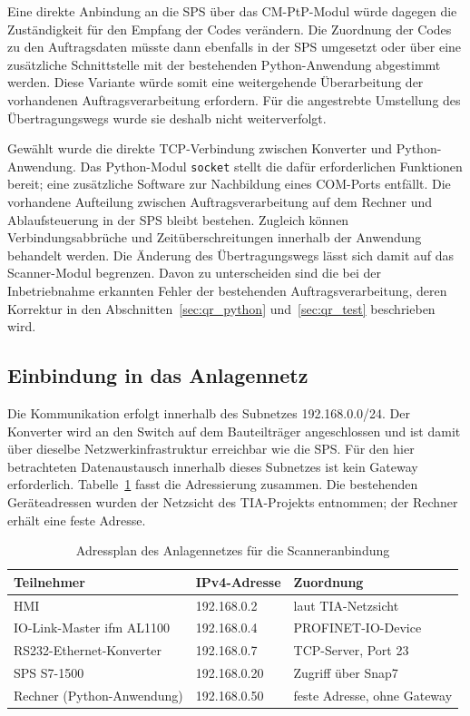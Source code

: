 Eine direkte Anbindung an die SPS über das CM-PtP-Modul würde dagegen die Zuständigkeit für den Empfang der Codes verändern. Die Zuordnung der Codes zu den Auftragsdaten müsste dann ebenfalls in der SPS umgesetzt oder über eine zusätzliche Schnittstelle mit der bestehenden Python-Anwendung abgestimmt werden. Diese Variante würde somit eine weitergehende Überarbeitung der vorhandenen Auftragsverarbeitung erfordern. Für die angestrebte Umstellung des Übertragungswegs wurde sie deshalb nicht weiterverfolgt.

Gewählt wurde die direkte TCP-Verbindung zwischen Konverter und Python-Anwendung. Das Python-Modul \texttt{socket} stellt die dafür erforderlichen Funktionen bereit; eine zusätzliche Software zur Nachbildung eines COM-Ports entfällt. \cite{python_socket_api} Die vorhandene Aufteilung zwischen Auftragsverarbeitung auf dem Rechner und Ablaufsteuerung in der SPS bleibt bestehen. Zugleich können Verbindungsabbrüche und Zeitüberschreitungen innerhalb der Anwendung behandelt werden. Die Änderung des Übertragungswegs lässt sich damit auf das Scanner-Modul begrenzen. Davon zu unterscheiden sind die bei der Inbetriebnahme erkannten Fehler der bestehenden Auftragsverarbeitung, deren Korrektur in den Abschnitten~\ref{sec:qr_python} und~\ref{sec:qr_test} beschrieben wird.

\subsection{Einbindung in das Anlagennetz}
\label{sec:qr_netz}

Die Kommunikation erfolgt innerhalb des Subnetzes 192.168.0.0/24. Der Konverter wird an den Switch auf dem Bauteilträger angeschlossen und ist damit über dieselbe Netzwerkinfrastruktur erreichbar wie die SPS. Für den hier betrachteten Datenaustausch innerhalb dieses Subnetzes ist kein Gateway erforderlich. \cite[Abschn.~3.3.1.1]{rfc1122} Tabelle~\ref{tab:qr_adressplan} fasst die Adressierung zusammen. Die bestehenden Geräteadressen wurden der Netzsicht des TIA-Projekts entnommen; der Rechner erhält eine feste Adresse.

\begin{table}[htbp]
  \centering
  \caption{Adressplan des Anlagennetzes für die Scanneranbindung}
  \label{tab:qr_adressplan}
  \small
  \begin{tabular}{|p{}|p{}|p{}|}
    \hline
    \textbf{Teilnehmer} & \textbf{IPv4-Adresse} & \textbf{Zuordnung} \\ \hline
    HMI & 192.168.0.2 & laut TIA-Netzsicht \\ \hline
    IO-Link-Master ifm AL1100 & 192.168.0.4 & PROFINET-IO-Device \\ \hline
    RS232-Ethernet-Konverter & 192.168.0.7 & TCP-Server, Port 23 \\ \hline
    SPS S7-1500 & 192.168.0.20 & Zugriff über Snap7 \\ \hline
    Rechner (Python-Anwendung) & 192.168.0.50 & feste Adresse, ohne Gateway \\ \hline
  \end{tabular}
\end{table}

